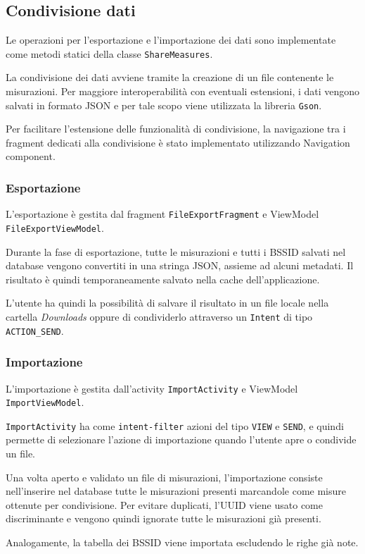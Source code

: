 
\subsection{Condivisione dati}

Le operazioni per l'esportazione e l'importazione dei dati sono implementate come metodi statici della classe \texttt{ShareMeasures}.

La condivisione dei dati avviene tramite la creazione di un file contenente le misurazioni.
Per maggiore interoperabilità con eventuali estensioni, i dati vengono salvati in formato JSON e per tale scopo viene utilizzata la libreria \texttt{Gson}.

Per facilitare l'estensione delle funzionalità di condivisione, la navigazione tra i fragment dedicati alla condivisione è stato implementato utilizzando Navigation component.

\subsubsection{Esportazione}
L'esportazione è gestita dal fragment \texttt{FileExportFragment} e ViewModel \texttt{FileExportViewModel}.

Durante la fase di esportazione, tutte le misurazioni e tutti i BSSID salvati nel database vengono convertiti in una stringa JSON, assieme ad alcuni metadati. Il risultato è quindi temporaneamente salvato nella cache dell'applicazione.

L'utente ha quindi la possibilità di salvare il risultato in un file locale nella cartella \textit{Downloads} oppure di condividerlo attraverso un \texttt{Intent} di tipo \texttt{ACTION\_SEND}.


\subsubsection{Importazione}
L'importazione è gestita dall'activity \texttt{ImportActivity} e ViewModel \texttt{ImportViewModel}.

\texttt{ImportActivity} ha come \texttt{intent-filter} azioni del tipo \texttt{VIEW} e \texttt{SEND}, e quindi permette di selezionare l'azione di importazione quando l'utente apre o condivide un file.

Una volta aperto e validato un file di misurazioni, l'importazione consiste nell'inserire nel database tutte le misurazioni presenti marcandole come misure ottenute per condivisione. Per evitare duplicati, l'UUID viene usato come discriminante e vengono quindi ignorate tutte le misurazioni già presenti.

Analogamente, la tabella dei BSSID viene importata escludendo le righe già note.